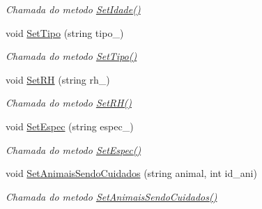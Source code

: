 \begin{DoxyCompactItemize}
\begin{DoxyCompactList}\small\item\em Chamada do metodo \mbox{\hyperlink{class_veterinario_ab77b4bda2c0785c8b696094a33f75f26}{Set\+Idade()}} \end{DoxyCompactList}\item 
\mbox{\label{class_veterinario_a680897038a4065995d5ff9641e77719b}} 
void \mbox{\hyperlink{class_veterinario_a680897038a4065995d5ff9641e77719b}{Set\+Tipo}} (string tipo\+\_\+)
\begin{DoxyCompactList}\small\item\em Chamada do metodo \mbox{\hyperlink{class_veterinario_a680897038a4065995d5ff9641e77719b}{Set\+Tipo()}} \end{DoxyCompactList}\item 
\mbox{\label{class_veterinario_a0222839ceb93ef39a9906f3ba8bfa118}} 
void \mbox{\hyperlink{class_veterinario_a0222839ceb93ef39a9906f3ba8bfa118}{Set\+RH}} (string rh\+\_\+)
\begin{DoxyCompactList}\small\item\em Chamada do metodo \mbox{\hyperlink{class_veterinario_a0222839ceb93ef39a9906f3ba8bfa118}{Set\+R\+H()}} \end{DoxyCompactList}\item 
\mbox{\label{class_veterinario_a1d6c0ea6363adaf4b291ee72823cab89}} 
void \mbox{\hyperlink{class_veterinario_a1d6c0ea6363adaf4b291ee72823cab89}{Set\+Espec}} (string espec\+\_\+)
\begin{DoxyCompactList}\small\item\em Chamada do metodo \mbox{\hyperlink{class_veterinario_a1d6c0ea6363adaf4b291ee72823cab89}{Set\+Espec()}} \end{DoxyCompactList}\item 
\mbox{\label{class_veterinario_a95e172a928028f2c6653fbec89e32cc3}} 
void \mbox{\hyperlink{class_veterinario_a95e172a928028f2c6653fbec89e32cc3}{Set\+Animais\+Sendo\+Cuidados}} (string animal, int id\+\_\+ani)
\begin{DoxyCompactList}\small\item\em Chamada do metodo \mbox{\hyperlink{class_veterinario_a95e172a928028f2c6653fbec89e32cc3}{Set\+Animais\+Sendo\+Cuidados()}} \end{DoxyCompactList}\item 

\end{DoxyCompactItemize}
